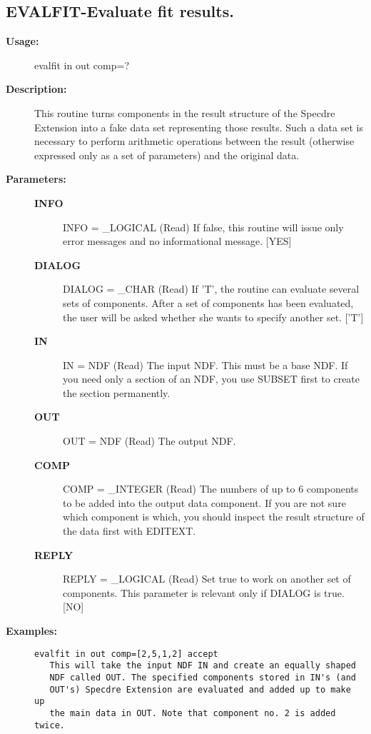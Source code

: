 \subsection{EVALFIT-\label{EVALFIT}Evaluate fit results.}
\begin{description}

\item [{\bf Usage:}]

   evalfit in out comp=?


\item [{\bf Description:}]
   This routine turns components in the result structure of the
   Specdre Extension into a fake data set representing those results.
   Such a data set is necessary to perform arithmetic operations
   between the result (otherwise expressed only as a set of
   parameters) and the original data.


\item [{\bf Parameters:}]
\begin{description}
\item [{\bf INFO}]
INFO = _LOGICAL (Read)
   If false, this routine will issue only error messages and no
   informational message. [YES]
\item [{\bf DIALOG}]
DIALOG = _CHAR (Read)
   If 'T', the routine can evaluate several sets of components.
   After a set of components has been evaluated, the user will be
   asked whether she wants to specify another set. ['T']
\item [{\bf IN}]
IN = NDF (Read)
   The input NDF. This must be a base NDF. If you need only a
   section of an NDF, you use SUBSET first to create the section
   permanently.
\item [{\bf OUT}]
OUT = NDF (Read)
   The output NDF.
\item [{\bf COMP}]
COMP = _INTEGER (Read)
   The numbers of up to 6 components to be added into the output
   data component. If you are not sure which component is which,
   you should inspect the result structure of the data first with
   EDITEXT.
\item [{\bf REPLY}]
REPLY = _LOGICAL (Read)
   Set true to work on another set of components. This parameter
   is relevant only if DIALOG is true.
   [NO]
\end{description}

\item [{\bf Examples:}]
\begin{verbatim}
evalfit in out comp=[2,5,1,2] accept
   This will take the input NDF IN and create an equally shaped
   NDF called OUT. The specified components stored in IN's (and
   OUT's) Specdre Extension are evaluated and added up to make up
   the main data in OUT. Note that component no. 2 is added twice.


\end{verbatim}
\end{description}
